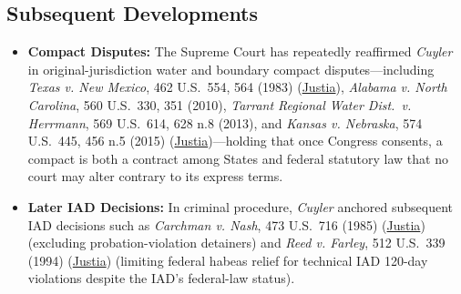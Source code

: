 \documentclass[12pt]{article}
\begin{document}
\subsection{Subsequent Developments}

\begin{itemize}

\item \textbf{Compact Disputes:} The Supreme Court has repeatedly reaffirmed \textit{Cuyler} in original-jurisdiction water and boundary compact disputes---including \textit{Texas v. New Mexico}, 462 U.S.\ 554, 564 (1983) (\href{https://supreme.justia.com/cases/federal/us/462/554/}{Justia}), \textit{Alabama v. North Carolina}, 560 U.S.\ 330, 351 (2010), \textit{Tarrant Regional Water Dist.\ v. Herrmann}, 569 U.S.\ 614, 628 n.8 (2013), and \textit{Kansas v. Nebraska}, 574 U.S.\ 445, 456 n.5 (2015) (\href{https://supreme.justia.com/cases/federal/us/574/445/}{Justia})---holding that once Congress consents, a compact is both a contract among States and federal statutory law that no court may alter contrary to its express terms.

\item \textbf{Later IAD Decisions:} In criminal procedure, \textit{Cuyler} anchored subsequent IAD decisions such as \textit{Carchman v. Nash}, 473 U.S.\ 716 (1985) (\href{https://supreme.justia.com/cases/federal/us/473/716/}{Justia}) (excluding probation-violation detainers) and \textit{Reed v. Farley}, 512 U.S.\ 339 (1994) (\href{https://supreme.justia.com/cases/federal/us/512/339/}{Justia}) (limiting federal habeas relief for technical IAD 120-day violations despite the IAD's federal-law status).

\end{itemize}
\end{document}
